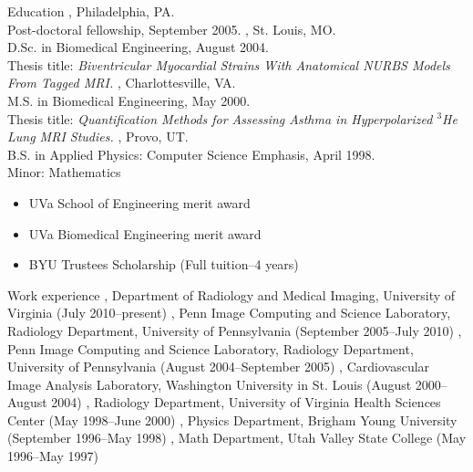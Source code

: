 \documentclass{resume}
\author{Nicholas J. Tustison}
\begin{document}
\maketitle


\begin{category}{Education}
   , Philadelphia, PA.\\
      Post-doctoral fellowship, September 2005.
   , St. Louis, MO.\\
      D.Sc. in Biomedical Engineering, August 2004.\\
      Thesis title: {\em Biventricular Myocardial Strains With Anatomical NURBS Models From Tagged MRI.}
   , Charlottesville, VA. \\
      M.S. in Biomedical Engineering, May 2000.\\
      Thesis title: {\em Quantification Methods for Assessing Asthma
                         in Hyperpolarized $^3$He Lung MRI Studies.}
   , Provo, UT. \\
      B.S. in Applied Physics: Computer Science Emphasis, April 1998.\\
      Minor: Mathematics
   \begin{itemize}
      \item UVa School of Engineering merit award
      \item UVa Biomedical Engineering merit award
      \item BYU Trustees Scholarship (Full tuition--4 years)
   \end{itemize}
\end{category}


\begin{category}{Work experience}
, Department of Radiology and Medical Imaging, University of Virginia (July 2010--present)
, Penn Image Computing and Science Laboratory, Radiology Department, University of Pennsylvania (September 2005--July 2010)
, Penn Image Computing and Science Laboratory, Radiology Department, 
                         University of Pennsylvania (August 2004--September 2005)
, Cardiovascular Image Analysis Laboratory, Washington University
                           in St. Louis (August 2000--August 2004)
, Radiology Department, University of Virginia Health
                            Sciences Center (May 1998--June 2000)
, Physics Department, Brigham Young University (September
                            1996--May 1998)
, Math Department, Utah Valley State College
                            (May 1996--May 1997)
\end{category}
\end{document}

